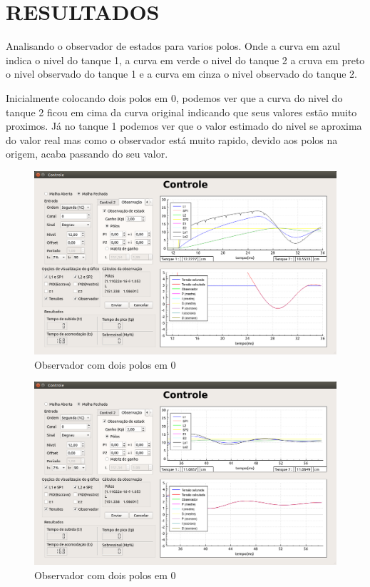 \documentclass[a4paper,12pt]{article}
\begin{document}
\newpage


\thispagestyle{main}

\section{RESULTADOS}
\hspace{4ex}Analisando o observador de estados para varios polos. Onde a curva em azul indica o nivel do tanque 1, a curva em verde o nivel do tanque 2 a cruva em preto o nivel observado do tanque 1 e a curva em cinza o nivel observado do tanque 2.

\hspace{4ex} Inicialmente colocando dois polos em 0, podemos ver que a curva do nivel do tanque 2 ficou em cima da curva original indicando que seus valores estão muito proximos. Já no tanque 1 podemos ver que o valor estimado do nivel se aproxima do valor real mas como o observador está muito rapido, devido aos polos na origem, acaba passando do seu valor.
\begin{figure}[!h]
\centering
\includegraphics[width=14cm]{FotosObservador/PolosEm01}
\caption{Observador com dois polos em 0}
\label{img1}
\end{figure}
\begin{figure}[!h]
\centering
\includegraphics[width=14cm]{FotosObservador/PolosEm02}
\caption{Observador com dois polos em 0}
\label{img2}
\end{figure}
\end{document}
